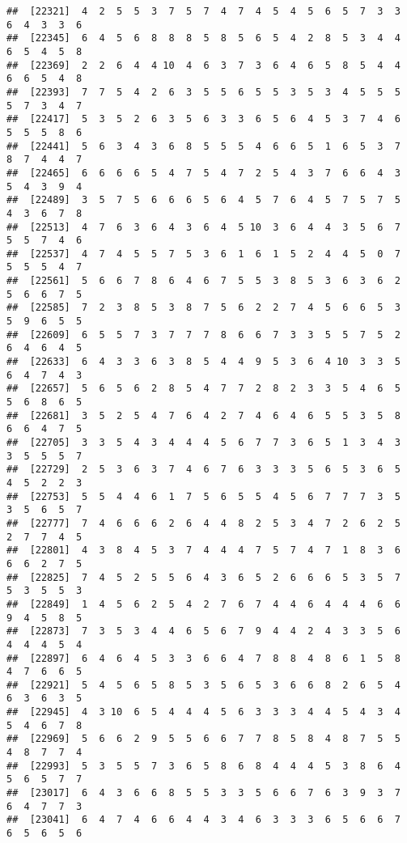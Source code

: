 \documentclass[
]{book}
\begin{document}
\begin{verbatim}
##  [22321]  4  2  5  5  3  7  5  7  4  7  4  5  4  5  6  5  7  3  3  6  4  3  3  6
##  [22345]  6  4  5  6  8  8  8  5  8  5  6  5  4  2  8  5  3  4  4  6  5  4  5  8
##  [22369]  2  2  6  4  4 10  4  6  3  7  3  6  4  6  5  8  5  4  4  6  6  5  4  8
##  [22393]  7  7  5  4  2  6  3  5  5  6  5  5  3  5  3  4  5  5  5  5  7  3  4  7
##  [22417]  5  3  5  2  6  3  5  6  3  3  6  5  6  4  5  3  7  4  6  5  5  5  8  6
##  [22441]  5  6  3  4  3  6  8  5  5  5  4  6  6  5  1  6  5  3  7  8  7  4  4  7
##  [22465]  6  6  6  6  5  4  7  5  4  7  2  5  4  3  7  6  6  4  3  5  4  3  9  4
##  [22489]  3  5  7  5  6  6  6  5  6  4  5  7  6  4  5  7  5  7  5  4  3  6  7  8
##  [22513]  4  7  6  3  6  4  3  6  4  5 10  3  6  4  4  3  5  6  7  5  5  7  4  6
##  [22537]  4  7  4  5  5  7  5  3  6  1  6  1  5  2  4  4  5  0  7  5  5  5  4  7
##  [22561]  5  6  6  7  8  6  4  6  7  5  5  3  8  5  3  6  3  6  2  5  6  6  7  5
##  [22585]  7  2  3  8  5  3  8  7  5  6  2  2  7  4  5  6  6  5  3  5  9  6  5  5
##  [22609]  6  5  5  7  3  7  7  7  8  6  6  7  3  3  5  5  7  5  2  6  4  6  4  5
##  [22633]  6  4  3  3  6  3  8  5  4  4  9  5  3  6  4 10  3  3  5  6  4  7  4  3
##  [22657]  5  6  5  6  2  8  5  4  7  7  2  8  2  3  3  5  4  6  5  5  6  8  6  5
##  [22681]  3  5  2  5  4  7  6  4  2  7  4  6  4  6  5  5  3  5  8  6  6  4  7  5
##  [22705]  3  3  5  4  3  4  4  4  5  6  7  7  3  6  5  1  3  4  3  3  5  5  5  7
##  [22729]  2  5  3  6  3  7  4  6  7  6  3  3  3  5  6  5  3  6  5  4  5  2  2  3
##  [22753]  5  5  4  4  6  1  7  5  6  5  5  4  5  6  7  7  7  3  5  3  5  6  5  7
##  [22777]  7  4  6  6  6  2  6  4  4  8  2  5  3  4  7  2  6  2  5  2  7  7  4  5
##  [22801]  4  3  8  4  5  3  7  4  4  4  7  5  7  4  7  1  8  3  6  6  6  2  7  5
##  [22825]  7  4  5  2  5  5  6  4  3  6  5  2  6  6  6  5  3  5  7  5  3  5  5  3
##  [22849]  1  4  5  6  2  5  4  2  7  6  7  4  4  6  4  4  4  6  6  9  4  5  8  5
##  [22873]  7  3  5  3  4  4  6  5  6  7  9  4  4  2  4  3  3  5  6  4  4  4  5  4
##  [22897]  6  4  6  4  5  3  3  6  6  4  7  8  8  4  8  6  1  5  8  4  7  6  6  5
##  [22921]  5  4  5  6  5  8  5  3  5  6  5  3  6  6  8  2  6  5  4  6  3  6  3  5
##  [22945]  4  3 10  6  5  4  4  4  5  6  3  3  3  4  4  5  4  3  4  5  4  6  7  8
##  [22969]  5  6  6  2  9  5  5  6  6  7  7  8  5  8  4  8  7  5  5  4  8  7  7  4
##  [22993]  5  3  5  5  7  3  6  5  8  6  8  4  4  4  5  3  8  6  4  5  6  5  7  7
##  [23017]  6  4  3  6  6  8  5  5  3  3  5  6  6  7  6  3  9  3  7  6  4  7  7  3
##  [23041]  6  4  7  4  6  6  4  4  3  4  6  3  3  3  6  5  6  6  7  6  5  6  5  6

\end{verbatim}
\end{document}
